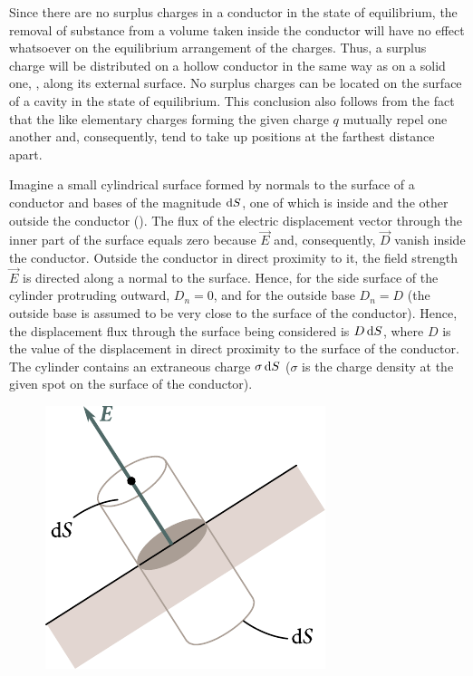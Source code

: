 Since there are no surplus charges in a conductor in the state of equilibrium, the removal of substance from a volume taken inside the conductor will have no effect whatsoever on the equilibrium arrangement of the charges. Thus, a surplus charge will be distributed on a hollow conductor in the same way as on a solid one, \ie, along its external surface. No surplus charges can be located on the surface of a cavity in the state of equilibrium. This conclusion also follows from the fact that the like elementary charges forming the given charge $q$ mutually repel one another and, consequently, tend to take up positions at the farthest distance apart.

Imagine a small cylindrical surface formed by normals to the surface of a conductor and bases of the magnitude $\mathrm{d} S$, one of which is inside and the other outside the conductor (). The flux of the electric displacement vector through the inner part of the surface equals zero because $\vec{E}$ and, consequently, $\vec{D}$ vanish inside the conductor. Outside the conductor in direct proximity to it, the field strength $\vec{E}$ is directed along a normal to the surface. Hence, for the side surface of the cylinder protruding outward, $D_n=0$, and for the outside base $D_n=D$ (the outside base is assumed to be very close to the surface of the conductor). Hence, the displacement flux through the surface being considered is $D\,\mathrm{d} S$, where $D$ is the value of the displacement in direct proximity to the surface of the conductor. The cylinder contains an extraneous charge $\sigma\,\mathrm{d} S$ ($\sigma$ is the charge density at the given spot on the surface of the conductor).

\begin{figure}[t]
	\begin{center}
		\includegraphics[scale=1]{figures/ch_03/fig_3_1.pdf}
		\caption[]{}
		\label{fig:3_1}
	\end{center}
	\vspace{-0.8cm}
\end{figure}

